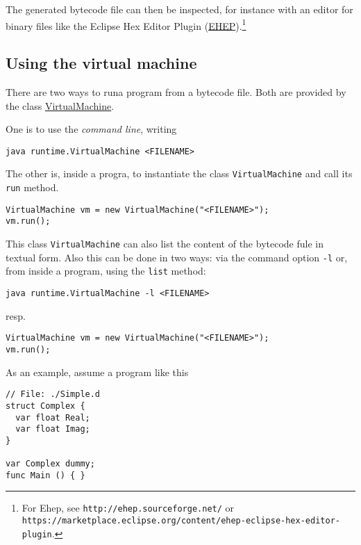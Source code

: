 \documentclass[11pt]{article}
\begin{document}
The generated bytecode file can then be inspected, for instance with an
editor for binary files like the Eclipse Hex Editor Plugin (\href{http://ehep.sourceforge.net/}{EHEP}).\footnote{For Ehep, see \texttt{http://ehep.sourceforge.net/} or
\texttt{https://marketplace.eclipse.org/content/ehep-eclipse-hex-editor-plugin}.}

\subsection{Using the virtual machine}
\label{sec:org916f425}

There are two ways to runa program from a bytecode file. Both are provided
by the class \href{../../../material/oblig2-patch/src/runtime/VirtualMachine.java}{VirtualMachine}.


One is to use the \emph{command line}, writing


\begin{verbatim}
java runtime.VirtualMachine <FILENAME>
\end{verbatim}

The other is, inside a progra, to instantiate the class \texttt{VirtualMachine}
and call its \texttt{run} method.

\begin{verbatim}
VirtualMachine vm = new VirtualMachine("<FILENAME>");
vm.run();
\end{verbatim}

This class \texttt{VirtualMachine} can also list the content of the bytecode fule
in textual form. Also this can be done in two ways: via the command option
\texttt{-l} or, from inside a program, using the \texttt{list} method:

\begin{verbatim}
java runtime.VirtualMachine -l <FILENAME>
\end{verbatim}

resp.

\begin{verbatim}
VirtualMachine vm = new VirtualMachine("<FILENAME>");
vm.run();
\end{verbatim}

As an example, assume a program like this

\lstset{language=java,label= ,caption= ,captionpos=b,numbers=none}
\begin{lstlisting}
// File: ./Simple.d
struct Complex {
  var float Real;
  var float Imag;
}

var Complex dummy;
func Main () { }
\end{lstlisting}
\end{document}
